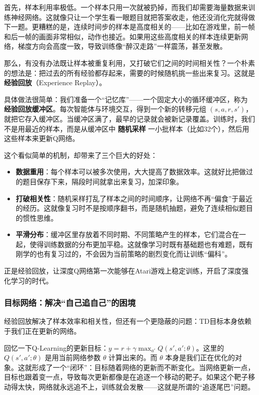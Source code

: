 \documentclass[lang=cn,zihao=-4,a4paper,fontset=windows]{beautybook}
\begin{document}
首先，样本利用率极低。一个样本只用一次就被扔掉，而我们却需要海量数据来训练神经网络。这就像只让一个学生看一眼题目就把答案收走，他还没消化完就得做下一题。更糟糕的是，连续时间步的样本是高度相关的——比如在游戏里，前一帧和后一帧的画面非常相似，动作也接近。如果用这些高度相关的样本连续更新网络，梯度方向会高度一致，导致训练像“醉汉走路”一样震荡，甚至发散。

那么，有没有办法既让样本被重复利用，又打破它们之间的时间相关性？一个朴素的想法是：把过去的所有经验都存起来，需要的时候随机挑一些出来复习。这就是 \textbf{经验回放}（Experience Replay）。

具体做法很简单：我们准备一个“记忆库”——一个固定大小的循环缓冲区，称为 \textbf{经验回放缓冲区}。每次智能体与环境交互，得到一个新的转移元组 \((s, a, r, s')\)，就把它存入缓冲区。当缓冲区满了，最早的记录就会被新记录覆盖。训练时，我们不是用最近的样本，而是从缓冲区中 \textbf{随机采样} 一小批样本（比如32个），然后用这些样本来更新Q网络。

这个看似简单的机制，却带来了三个巨大的好处：

\begin{itemize}
    \item \textbf{数据重用}：每个样本可以被多次使用，大大提高了数据效率。这就好比把做过的题目保存下来，隔段时间就拿出来复习，加深印象。
    \item \textbf{打破相关性}：随机采样打乱了样本之间的时间顺序，让网络不再“偏食”于最近的经历。这就像复习时不是按顺序翻书，而是随机抽题，避免了连续相似题目的惯性思维。
    \item \textbf{平滑分布}：缓冲区里存放着不同时期、不同策略产生的样本，它们混合在一起，使得训练数据的分布更加平稳。这就像学习时既有基础题也有难题，既有刚学的也有复习过的，不会因为当前策略的剧烈变化而让训练“偏科”。
\end{itemize}

正是经验回放，让深度Q网络第一次能够在Atari游戏上稳定训练，开启了深度强化学习的时代。

\subsubsection{目标网络：解决“自己追自己”的困境}

经验回放解决了样本效率和相关性，但还有一个更隐蔽的问题：TD目标本身依赖于我们正在更新的网络。

回忆一下Q-Learning的更新目标：\(y = r + \gamma \max_{a'} Q(s', a'; \theta)\)。这里的 \(Q(s', a'; \theta)\) 是用当前网络参数 \(\theta\) 计算出来的。而 \(\theta\) 本身是我们正在优化的对象。这就形成了一个“闭环”：目标随着网络的更新而不断变化。当网络更新一点，目标也跟着变一点，导致每次更新都像是在追逐一个移动的靶子。如果这个靶子移动得太快，网络就永远追不上，训练就会发散——这就是所谓的“追逐尾巴”问题。
\end{document}

